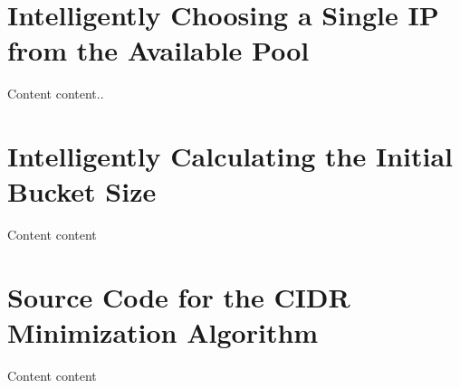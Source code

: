 \begin{appendices}
\chapter{Intelligently Choosing a Single IP from the Available Pool}
\label{appendix:smartSingleIP}
Content content..

\chapter{Intelligently Calculating the Initial Bucket Size}
\label{appendix:smartInitBucket}
Content content

\chapter{Source Code for the CIDR Minimization Algorithm}
\label{appendix:algSourceCode}
Content content

\end{appendices}